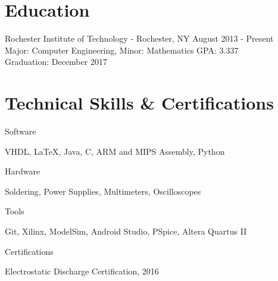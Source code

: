 \documentclass[a4paper,margin,line]{resume}
\newcommand{\rdate}[1]{\hfill {\small #1}}
\begin{document}
\begin{resume}
\section{\mysidestyle Education}
	\begin{compactdesc}
		\item[Rochester Institute of Technology] - Rochester, NY \rdate{August 2013 - Present} \\
            Major: Computer Engineering, Minor: Mathematics \rdate{GPA: 3.337} \\
            Graduation: December 2017
	\end{compactdesc}

\section{\mysidestyle Technical Skills \& Certifications}
    \begin{compactdesc}
		\item[Software] \begin{inparaenum} { \small
            VHDL,
            \LaTeX,
			Java,
			C,
            ARM and MIPS Assembly,
            Python
		} \end{inparaenum}
		\item[Hardware] \begin{inparaenum} { \small
			Soldering,
            Power Supplies,
            Multimeters,
            Oscilloscopes
		} \end{inparaenum}
        \item[Tools] \begin{inparaenum} { \small
            Git,
            Xilinx,
            ModelSim,
            Android Studio,
            PSpice,
            Altera Quartus II
        } \end{inparaenum}
        \item[Certifications] \begin{inparaenum} { \small
            Electrostatic Discharge Certification, 2016   
        } \end{inparaenum}
	\end{compactdesc}


\end{resume}
\end{document}
